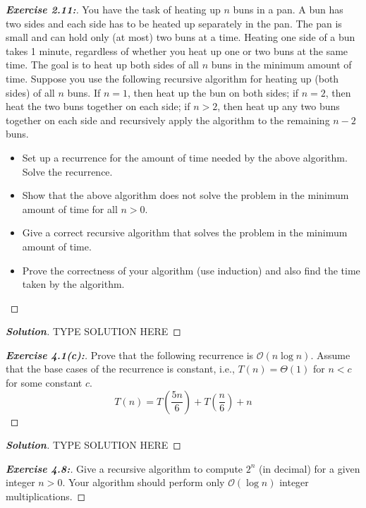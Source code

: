 \documentclass[a4paper]{article}
\newenvironment{solution}{\begin{proof}[\textnormal{\textbf{Solution}}]}{\end{proof}}
\newenvironment{exercise}[1]{\begin{proof}[\textnormal{\textbf{Exercise #1:}}]\renewcommand{\qedsymbol}{}}{\end{proof}}
\newcommand{\bigO}[1]{\mathcal{O}\left(#1\right)}
\newcommand{\bigTh}[1]{\Theta\left(#1\right)}
\begin{document}
\begin{exercise}{2.11}

    You have the task of heating up \(n\) buns in a pan. A bun has two sides and each side has to be heated up separately in the pan. The pan is small and can hold only (at most) two buns at a time. Heating one side of a bun takes 1 minute, regardless of whether you heat up one or two buns at the same time. The goal is to heat up both sides of all \(n\) buns in the minimum amount of time. Suppose you use the following recursive algorithm for heating up (both sides) of all \(n\) buns. If \(n = 1\), then heat up the bun on both sides;  if \(n = 2\), then heat the two buns together on each side; if \(n > 2\), then heat up any two buns together on each side and recursively apply the algorithm to the remaining \(n − 2\) buns.

    \begin{itemize}
        \item Set up a recurrence for the amount of time needed by the above algorithm. Solve the recurrence.
        \item Show that the above algorithm does not solve the problem in the minimum amount of time for all \(n >0\).
        \item Give a correct recursive algorithm that solves the problem in the minimum amount of time.
        \item Prove the correctness of your algorithm (use induction) and also find the time taken by the algorithm.
    \end{itemize}
\end{exercise}

\begin{solution}
    TYPE SOLUTION HERE
\end{solution}

\begin{exercise}{4.1(c)}
    Prove that the following recurrence is \(\bigO{n\log{n}}\). Assume that the base cases of the recurrence is constant, i.e., \(T(n) = \bigTh{1}\) for \(n < c\) for some constant \(c\).
    \[T(n) = T\left(\frac{5n}{6}\right) + T\left(\frac{n}{6}\right) + n\]
\end{exercise}

\begin{solution}
    TYPE SOLUTION HERE
\end{solution}

\begin{exercise}{4.8}
    Give a recursive algorithm to compute \(2^n\) (in decimal) for a given integer \(n > 0\). Your algorithm should perform only \(\bigO{\log n}\) integer multiplications.
\end{exercise}
\end{document}

